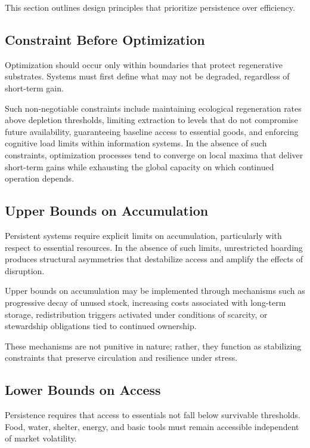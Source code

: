 \documentclass[12pt]{article} \usepackage[margin=1in]{geometry} \usepackage{setspace} \usepackage{amsmath,amssymb} \usepackage{hyperref}
\begin{document}
This section outlines design principles that prioritize persistence over efficiency.

\subsection{Constraint Before Optimization}

Optimization should occur only within boundaries that protect regenerative substrates. Systems must first define what may not be degraded, regardless of short-term gain.

Such non-negotiable constraints include maintaining ecological regeneration rates above depletion thresholds, limiting extraction to levels that do not compromise future availability, guaranteeing baseline access to essential goods, and enforcing cognitive load limits within information systems. In the absence of such constraints, optimization processes tend to converge on local maxima that deliver short-term gains while exhausting the global capacity on which continued operation depends.

\subsection{Upper Bounds on Accumulation}

Persistent systems require explicit limits on accumulation, particularly with respect to essential resources. In the absence of such limits, unrestricted hoarding produces structural asymmetries that destabilize access and amplify the effects of disruption.

Upper bounds on accumulation may be implemented through mechanisms such as progressive decay of unused stock, increasing costs associated with long-term storage, redistribution triggers activated under conditions of scarcity, or stewardship obligations tied to continued ownership.

These mechanisms are not punitive in nature; rather, they function as stabilizing constraints that preserve circulation and resilience under stress.

\subsection{Lower Bounds on Access}

Persistence requires that access to essentials not fall below survivable thresholds. Food, water, shelter, energy, and basic tools must remain accessible independent of market volatility.
\end{document}
